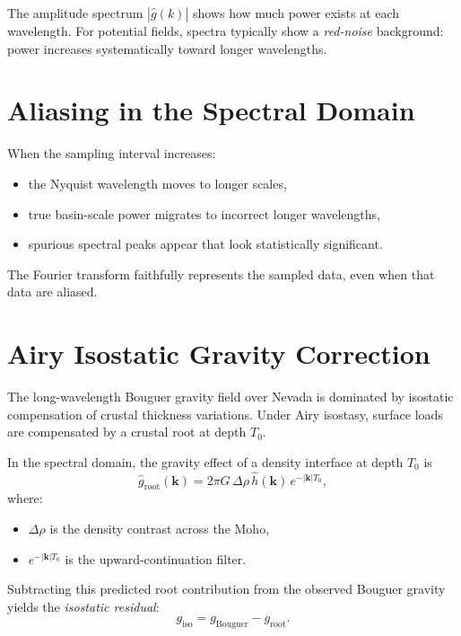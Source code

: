 \documentclass[11pt,a4paper]{article}
\begin{document}
The amplitude spectrum $|\hat{g}(k)|$ shows how much power exists at each wavelength.
For potential fields, spectra typically show a \emph{red-noise} background:
power increases systematically toward longer wavelengths.

\section{Aliasing in the Spectral Domain}

When the sampling interval increases:
\begin{itemize}
  \item the Nyquist wavelength moves to longer scales,
  \item true basin-scale power migrates to incorrect longer wavelengths,
  \item spurious spectral peaks appear that look statistically significant.
\end{itemize}

The Fourier transform faithfully represents the sampled data,
even when that data are aliased.

\section{Airy Isostatic Gravity Correction}

The long-wavelength Bouguer gravity field over Nevada is dominated by
isostatic compensation of crustal thickness variations.
Under Airy isostasy, surface loads are compensated by a crustal root at depth $T_0$.

In the spectral domain, the gravity effect of a density interface at depth $T_0$ is
\begin{equation}
\hat{g}_{\text{root}}(\mathbf{k})
=
2\pi G\, \Delta\rho \, \hat{h}(\mathbf{k}) \, e^{-|\mathbf{k}| T_0},
\end{equation}
where:
\begin{itemize}
  \item $\Delta\rho$ is the density contrast across the Moho,
  \item $e^{-|\mathbf{k}|T_0}$ is the upward-continuation filter.
\end{itemize}

Subtracting this predicted root contribution from the observed Bouguer gravity yields
the \emph{isostatic residual}:
\begin{equation}
g_{\text{iso}} = g_{\text{Bouguer}} - g_{\text{root}}.
\end{equation}
\end{document}
